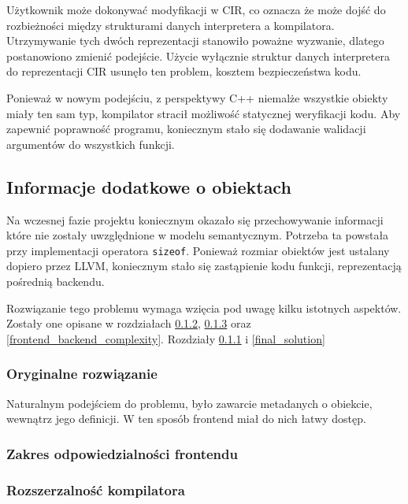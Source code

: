 Użytkownik może dokonywać modyfikacji w CIR, co oznacza że może dojść do rozbieżności między strukturami danych interpretera a kompilatora. Utrzymywanie tych dwóch reprezentacji stanowiło poważne wyzwanie, dlatego postanowiono zmienić podejście. Użycie wyłącznie struktur danych interpretera do reprezentacji CIR usunęło ten problem, kosztem bezpieczeństwa kodu.


Ponieważ w nowym podejściu, z perspektywy C++ niemalże wszystkie obiekty miały ten sam typ, kompilator stracił możliwość statycznej weryfikacji kodu.
Aby zapewnić poprawność programu, koniecznym stało się dodawanie walidacji argumentów do wszystkich funkcji.

\subsection{Informacje dodatkowe o obiektach}
Na wczesnej fazie projektu koniecznym okazało się przechowywanie informacji które nie zostały uwzględnione w modelu semantycznym.
Potrzeba ta powstała przy implementacji operatora \texttt{sizeof}.
Ponieważ rozmiar obiektów jest ustalany dopiero przez LLVM, koniecznym stało się zastąpienie kodu funkcji, reprezentacją pośrednią backendu.

Rozwiązanie tego problemu wymaga wzięcia pod uwagę kilku istotnych aspektów.
Zostały one opisane w rozdziałach \ref{frontend_responsibility}, \ref{compiler_extensibility} oraz \ref{frontend_backend_complexity}.
Rozdziały \ref{original_solution} i \ref{final_solution}

\subsubsection{Oryginalne rozwiązanie}\label{original_solution}

Naturalnym podejściem do problemu, było zawarcie metadanych o obiekcie, wewnątrz jego definicji.
W ten sposób frontend miał do nich łatwy dostęp.

\subsubsection{Zakres odpowiedzialności frontendu} \label{frontend_responsibility}

\subsubsection{Rozszerzalność kompilatora}\label{compiler_extensibility}

